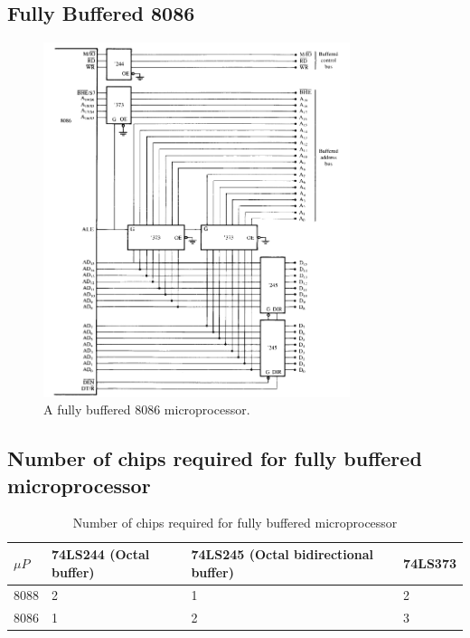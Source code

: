 \subsection{Fully Buffered 8086}
\begin{figure}[h!]
  \includegraphics[width = 0.8\textwidth]{./figures/8086_fully_buff.png}
  \caption{A fully buffered 8086 microprocessor.}
  \label{}
\end{figure}
\newpage
\subsection{Number of chips required for fully buffered microprocessor}
\begin{table}[h!]
\centering
\begin{tabular}{ |p{1cm}|p{3cm}||p{4cm}||p{1cm}| }
\hline
$\mu P$ & \textbf{74LS244} (Octal buffer) & \textbf{74LS245} (Octal bidirectional buffer) & \textbf{74LS373} \\
\hline
8088 & 2  & 1 & 2\\
8086 & 1  & 2 & 3\\
\hline
\end{tabular}

\caption{Number of chips required for fully buffered microprocessor}
\label{table:4}
\end{table}
